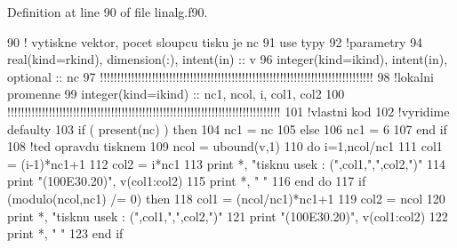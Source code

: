 Definition at line 90 of file linalg.\+f90.


\begin{DoxyCode}
90    \textcolor{comment}{! vytiskne vektor, pocet sloupcu tisku je nc
}
91      \textcolor{keywordtype}{use }typy
92      \textcolor{comment}{!parametry
}
94       \textcolor{keywordtype}{real(kind=rkind)}, \textcolor{keywordtype}{dimension(:)}, \textcolor{keywordtype}{intent(in)} :: v
96       \textcolor{keywordtype}{integer(kind=ikind)}, \textcolor{keywordtype}{intent(in)}, \textcolor{keywordtype}{optional}  :: nc 
97       \textcolor{comment}{!!!!!!!!!!!!!!!!!!!!!!!!!!!!!!!!!!!!!!!!!!!!!!!!!!!!!!!!!!!!!!!!!!!!!!!!!!!!!!!
}
98       \textcolor{comment}{!lokalni promenne
}
99       \textcolor{keywordtype}{integer(kind=ikind)} :: nc1, ncol, i, col1, col2
100       \textcolor{comment}{!!!!!!!!!!!!!!!!!!!!!!!!!!!!!!!!!!!!!!!!!!!!!!!!!!!!!!!!!!!!!!!!!!!!!!!!!!!!!!!
}
101       \textcolor{comment}{!vlastni kod
}
102       \textcolor{comment}{!vyridime defaulty
}
103       \textcolor{keywordflow}{if} ( \textcolor{keyword}{present}(nc) ) then
104         nc1 = nc
105       else
106         nc1 = 6
107 \textcolor{keyword}{      end }if
108       \textcolor{comment}{!ted opravdu tisknem
}
109       ncol = ubound(v,1)
110       \textcolor{keywordflow}{do} i=1,ncol/nc1
111         col1 = (i-1)*nc1+1
112         col2 = i*nc1
113         print *, \textcolor{stringliteral}{"tisknu usek : ("},col1,\textcolor{stringliteral}{","},col2,\textcolor{stringliteral}{")"}
114         print \textcolor{stringliteral}{"(100E30.20)"}, v(col1:col2)
115         print *, \textcolor{stringliteral}{"  "} 
116 \textcolor{keyword}{      end }do
117       \textcolor{keywordflow}{if} (modulo(ncol,nc1) /= 0) then
118         col1 = (ncol/nc1)*nc1+1
119         col2 = ncol      
120         print *, \textcolor{stringliteral}{"tisknu usek : ("},col1,\textcolor{stringliteral}{","},col2,\textcolor{stringliteral}{")"}
121         print \textcolor{stringliteral}{"(100E30.20)"}, v(col1:col2)
122         print *, \textcolor{stringliteral}{"  "}    
123 \textcolor{keywordflow}{      end if}   
\end{DoxyCode}
